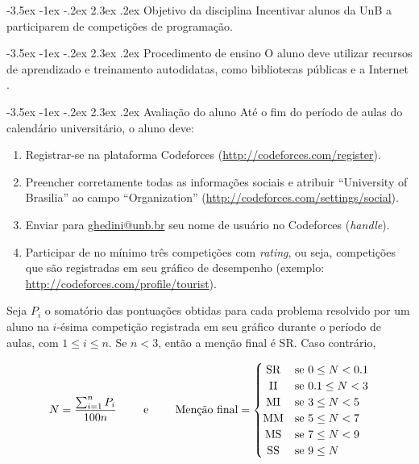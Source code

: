 \documentclass{UnBExam}%
\makeatletter
\renewcommand\section{\@startsection{section}{1}{\z@}%
	{-3.5ex \@plus -1ex \@minus -.2ex}%
	{2.3ex \@plus.2ex}%
	{\normalfont\normalsize\bfseries}}%
\renewcommand{\indent}{\hspace{.5cm}}
\makeatother
\begin{document}
	
\section{Objetivo da disciplina}
\indent Incentivar alunos da UnB a participarem de competições de programação.

\section{Procedimento de ensino}
\indent O aluno deve utilizar recursos de aprendizado e treinamento autodidatas, como bibliotecas públicas e a Internet \cite{halim2013competitive,cormen2009introduction,pimentaarticle}.

\section{Avaliação do aluno}
\indent Até o fim do período de aulas do calendário universitário, o aluno deve:
\begin{enumerate}
	\item Registrar-se na plataforma Codeforces (\url{http://codeforces.com/register}).
	\item Preencher corretamente todas as informações sociais e atribuir ``University of Brasilia'' ao campo ``Organization'' (\url{http://codeforces.com/settings/social}).
	\item Enviar para \url{ghedini@unb.br} seu nome de usuário no Codeforces (\textit{handle}).
	\item Participar de no mínimo três competições com \textit{rating}, ou seja, competições que são registradas em seu gráfico de desempenho (exemplo: \url{http://codeforces.com/profile/tourist}).
\end{enumerate}
\indent Seja $P_i$ o somatório das pontuações obtidas para cada problema resolvido por um aluno na $i$-ésima competição registrada em seu gráfico durante o período de aulas, com $1 \leq i \leq n$. Se $n < 3$, então a menção final é SR. Caso contrário,

\vspace{-.7cm}
\[
\begin{array}{ccc}
	N = \dfrac{\sum_{i=1}^{n} P_i}{100n} & \;\;\;\;\; \text{e} \;\;\;\;\; & 
	\text{Menção final} =
	\begin{cases}
	\hfill \text{SR} \hfill & \text{se } 0 \leq N < 0.1 \\
	\hfill \text{II} \hfill & \text{se } 0.1 \leq N < 3 \\
	\hfill \text{MI} \hfill & \text{se } 3 \leq N < 5 \\
	\hfill \text{MM} \hfill & \text{se } 5 \leq N < 7 \\
	\hfill \text{MS} \hfill & \text{se } 7 \leq N < 9 \\
	\hfill \text{SS} \hfill & \text{se } 9 \leq N \\
	\end{cases}
\end{array}
\]
\end{document}
